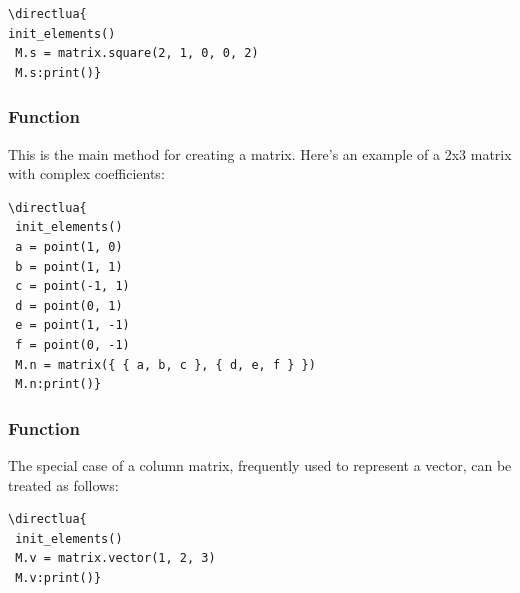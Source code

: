 \vspace{.5em}
\begin{minipage}{.5\textwidth}
\begin{verbatim}
\directlua{
init_elements()
 M.s = matrix.square(2, 1, 0, 0, 2)
 M.s:print()}
  \end{verbatim}
\end{minipage}
\begin{minipage}{.5\textwidth}
\end{minipage}

\subsubsection{Function }
\label{ssub:method_new}

This is the main method for creating a matrix. Here's an example of a 2x3 matrix with complex coefficients:

\vspace{.5em}
\begin{minipage}{.5\textwidth}
\begin{verbatim}
\directlua{
 init_elements()
 a = point(1, 0)
 b = point(1, 1)
 c = point(-1, 1)
 d = point(0, 1)
 e = point(1, -1)
 f = point(0, -1)
 M.n = matrix({ { a, b, c }, { d, e, f } })
 M.n:print()}
\end{verbatim}
\end{minipage}
\begin{minipage}{.5\textwidth}
\end{minipage}

\subsubsection{Function }
\label{ssub:method_vector}

The special case of a column matrix, frequently used to represent a vector, can be treated as follows:

\vspace{.5em}
\begin{minipage}{.5\textwidth}
\begin{verbatim}
\directlua{
 init_elements()
 M.v = matrix.vector(1, 2, 3)
 M.v:print()}
  \end{verbatim}
\end{minipage}
\begin{minipage}{.5\textwidth}
\end{minipage}

